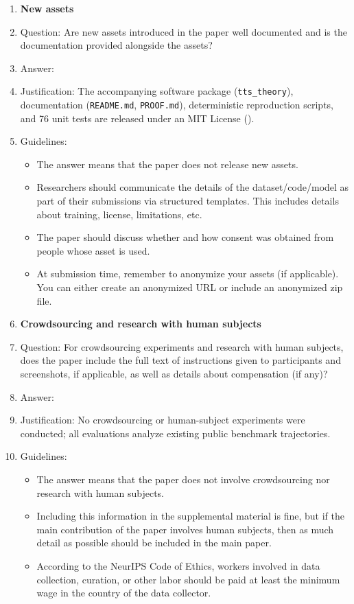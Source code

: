 \documentclass{article}
\theoremstyle{plain}
\theoremstyle{definition}
\theoremstyle{remark}
\begin{document}
\begin{enumerate}
\item {\bf New assets}
    \item[] Question: Are new assets introduced in the paper well documented and is the documentation provided alongside the assets?
    \item[] Answer: \answerYes{}
    \item[] Justification: The accompanying software package (\texttt{tts\_theory}), documentation (\texttt{README.md}, \texttt{PROOF.md}), deterministic reproduction scripts, and 76 unit tests are released under an MIT License ().
    \item[] Guidelines:
    \begin{itemize}
        \item The answer \answerNA{} means that the paper does not release new assets.
        \item Researchers should communicate the details of the dataset\slash code\slash model as part of their submissions via structured templates. This includes details about training, license, limitations, etc.
        \item The paper should discuss whether and how consent was obtained from people whose asset is used.
        \item At submission time, remember to anonymize your assets (if applicable). You can either create an anonymized URL or include an anonymized zip file.
    \end{itemize}

\item {\bf Crowdsourcing and research with human subjects}
    \item[] Question: For crowdsourcing experiments and research with human subjects, does the paper include the full text of instructions given to participants and screenshots, if applicable, as well as details about compensation (if any)?
    \item[] Answer: \answerNA{}
    \item[] Justification: No crowdsourcing or human-subject experiments were conducted; all evaluations analyze existing public benchmark trajectories.
    \item[] Guidelines:
    \begin{itemize}
        \item The answer \answerNA{} means that the paper does not involve crowdsourcing nor research with human subjects.
        \item Including this information in the supplemental material is fine, but if the main contribution of the paper involves human subjects, then as much detail as possible should be included in the main paper.
        \item According to the NeurIPS Code of Ethics, workers involved in data collection, curation, or other labor should be paid at least the minimum wage in the country of the data collector.
    \end{itemize}


\end{enumerate}
\end{document}
